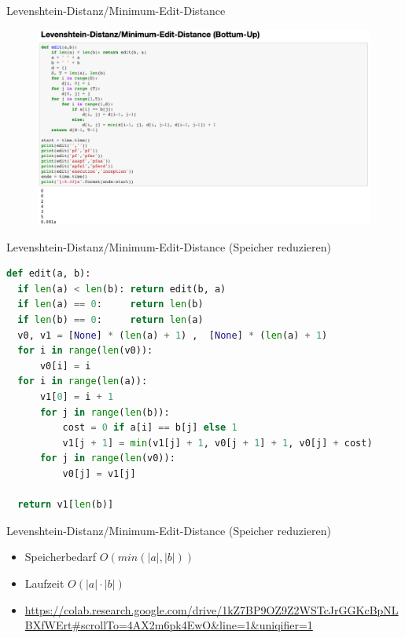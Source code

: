 \documentclass[aspectratio=169]{beamer}
\begin{document}
\begin{frame}[fragile]{Levenshtein-Distanz/Minimum-Edit-Distance}
\begin{figure}
    \centering
    \includegraphics[width=0.85\linewidth]{code_bottom_up.png}
\end{figure}
\end{frame}

\begin{frame}[fragile]{Levenshtein-Distanz/Minimum-Edit-Distance (Speicher reduzieren)}
\begin{lstlisting}[language=Python]
def edit(a, b):
  if len(a) < len(b): return edit(b, a)
  if len(a) == 0:     return len(b)
  if len(b) == 0:     return len(a)
  v0, v1 = [None] * (len(a) + 1) ,  [None] * (len(a) + 1)
  for i in range(len(v0)):
      v0[i] = i
  for i in range(len(a)):
      v1[0] = i + 1
      for j in range(len(b)):
          cost = 0 if a[i] == b[j] else 1
          v1[j + 1] = min(v1[j] + 1, v0[j + 1] + 1, v0[j] + cost)
      for j in range(len(v0)):
          v0[j] = v1[j]

  return v1[len(b)]
\end{lstlisting}
\end{frame}

\begin{frame}[fragile]{Levenshtein-Distanz/Minimum-Edit-Distance (Speicher reduzieren)}
\begin{itemize}
    \item Speicherbedarf $O(min(|a|,|b|))$
    \item Laufzeit $O(|a|\cdot|b|)$
    \item \url{https://colab.research.google.com/drive/1kZ7BP9OZ9Z2WSTcJrGGKcBpNLBXfWErt#scrollTo=4AX2m6pk4EwO&line=1&uniqifier=1}
\end{itemize}
\end{frame}
\end{document}
